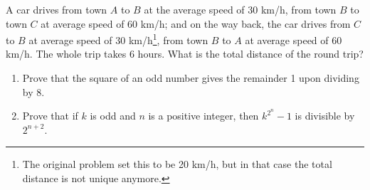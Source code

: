 \begin{problems}
    \problem[fixed] A car drives from town $A$ to $B$ at the average speed of 30 km/h,
    from town $B$ to town $C$ at average speed of 60 km/h; and on the way back,
    the car drives from $C$ to $B$ at average speed of 30 km/h\footnote{The
    original problem set this to be 20 km/h, but in that case the total
    distance is not unique anymore.}, from town $B$ to $A$ at average speed of 60
    km/h. The whole trip takes 6 hours. What is the total distance of the round
    trip?
    
    \problem 
    \begin{enumerate}
        \item Prove that the square of an odd number gives the remainder 1 upon
            dividing by 8. 
        
        \item Prove that if $k$ is odd and $n$ is a positive integer, then
            $k^{2^n} - 1$ is divisible by $2^{n + 2}$. 
    \end{enumerate}
\end{problems}
